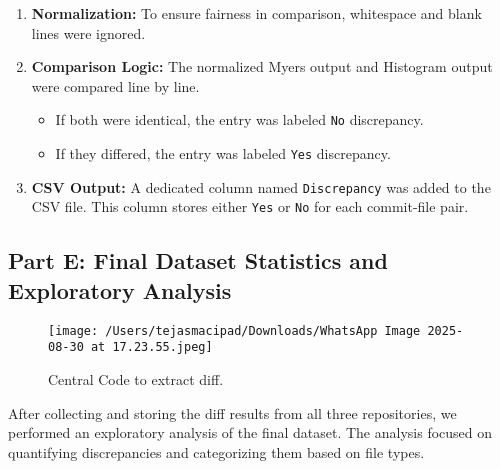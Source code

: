 \documentclass[12pt,a4paper]{article}
\begin{document}
\begin{enumerate}
    \item \textbf{Normalization:}  
    To ensure fairness in comparison, whitespace and blank lines were ignored.

    \item \textbf{Comparison Logic:}  
    The normalized Myers output and Histogram output were compared line by line.  
    \begin{itemize}
        \item If both were identical, the entry was labeled \texttt{No} discrepancy.  
        \item If they differed, the entry was labeled \texttt{Yes} discrepancy.  
    \end{itemize}

    \item \textbf{CSV Output:}  
    A dedicated column named \texttt{Discrepancy} was added to the CSV file. This column stores either \texttt{Yes} or \texttt{No} for each commit-file pair.

\end{enumerate}

\subsection*{Part E: Final Dataset Statistics and Exploratory Analysis}

\begin{figure}[h!]
    \centering
    \texttt{[image: /Users/tejasmacipad/Downloads/WhatsApp Image 2025-08-30 at 17.23.55.jpeg]}
    \caption{Central Code to extract diff.}
    \label{fig:diff-example}
\end{figure}

After collecting and storing the diff results from all three repositories, we performed an exploratory analysis of the final dataset. The analysis focused on quantifying discrepancies and categorizing them based on file types.
\end{document}
